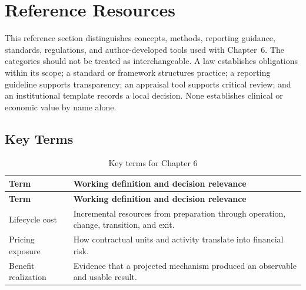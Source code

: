 \section{Reference Resources}
\label{sec:comp-ch06-reference}

This reference section distinguishes concepts, methods, reporting guidance,
standards, regulations, and author-developed tools used with Chapter~6. The
categories should not be treated as interchangeable. A law establishes obligations
within its scope; a standard or framework structures practice; a reporting guideline
supports transparency; an appraisal tool supports critical review; and an
institutional template records a local decision. None establishes clinical or
economic value by name alone. 

\subsection{Key Terms}
\begin{longtable}{@{}p{}p{}@{}}
\caption{Key terms for Chapter 6}
\label{tab:comp-ch06-key-terms}\\
\toprule
\textbf{Term} & \textbf{Working definition and decision relevance} \\
\midrule
\endfirsthead
\toprule
\textbf{Term} & \textbf{Working definition and decision relevance} \\
\midrule
\endhead
\bottomrule
\endlastfoot
Lifecycle cost & Incremental resources from preparation through operation, change, transition, and exit. \\
Pricing exposure & How contractual units and activity translate into financial risk. \\
Benefit realization & Evidence that a projected mechanism produced an observable and usable result. \\
\end{longtable}

